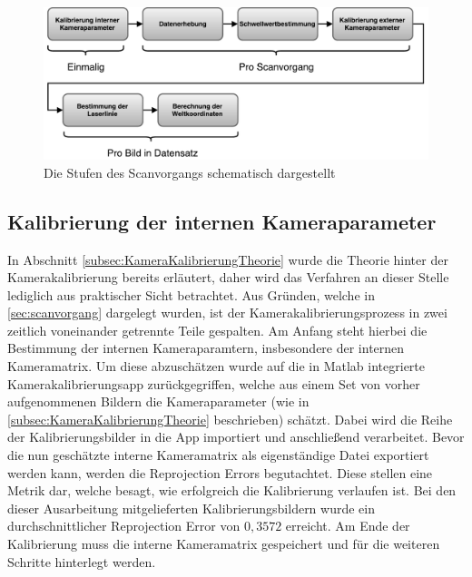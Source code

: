 \begin{figure}
\includegraphics[width=\textwidth]{images/ScannerVerfahrenHori.pdf}
\caption{Die Stufen des Scanvorgangs schematisch dargestellt}\label{fig:scanVorgang}
\end{figure}

\subsection{Kalibrierung der internen Kameraparameter}
\label{subsec:interneKalibrierung}
In Abschnitt \ref{subsec:KameraKalibrierungTheorie} wurde die Theorie hinter der Kamerakalibrierung bereits erläutert, daher wird das Verfahren an dieser Stelle lediglich aus praktischer Sicht betrachtet. Aus Gründen, welche in \ref{sec:scanvorgang} dargelegt wurden, ist der Kamerakalibrierungsprozess in zwei zeitlich voneinander getrennte Teile gespalten. Am Anfang steht hierbei die Bestimmung der internen Kameraparamtern, insbesondere der internen Kameramatrix. Um diese abzuschätzen wurde auf die in Matlab integrierte Kamerakalibrierungsapp zurückgegriffen, welche aus einem Set von vorher aufgenommenen Bildern die Kameraparameter (wie in \ref{subsec:KameraKalibrierungTheorie} beschrieben) schätzt. Dabei wird die Reihe der Kalibrierungsbilder in die App importiert und anschließend verarbeitet. Bevor die nun geschätzte interne Kameramatrix als eigenständige Datei exportiert werden kann, werden die Reprojection Errors begutachtet. Diese stellen eine Metrik dar, welche besagt, wie erfolgreich die Kalibrierung verlaufen ist. Bei den dieser Ausarbeitung mitgelieferten Kalibrierungsbildern wurde ein durchschnittlicher Reprojection Error von  \(0,3572\) erreicht. Am Ende der Kalibrierung muss die interne Kameramatrix gespeichert und für die weiteren Schritte hinterlegt werden.  

